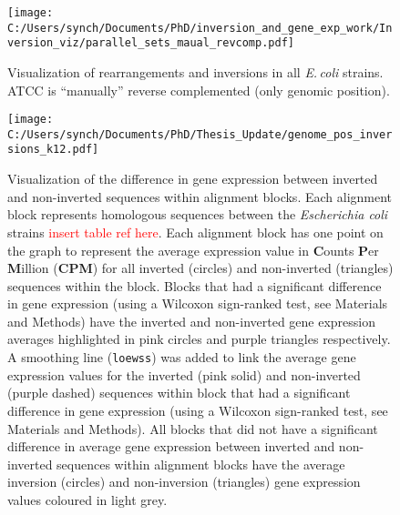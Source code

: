 \documentclass[12pt]{article}
\newcommand{\ecol}{\textit{E.\,coli}\xspace}
\newcommand{\ecoli}{\textit{Escherichia coli}\xspace}
\begin{document}
\begin{figure}
	\texttt{[image: C:/Users/synch/Documents/PhD/inversion\_and\_gene\_exp\_work/Inversion\_viz/parallel\_sets\_maual\_revcomp.pdf]}
	\caption{\label{fig:inversion_manual_revcomp} Visualization of rearrangements and inversions in all \ecol strains. ATCC is ``manually'' reverse complemented (only genomic position).}
\end{figure}

\begin{figure}
	\texttt{[image: C:/Users/synch/Documents/PhD/Thesis\_Update/genome\_pos\_inversions\_k12.pdf]}
	\caption{\label{fig:inver_exp} Visualization of the difference in gene expression between inverted and non-inverted sequences within alignment blocks. Each alignment block represents homologous sequences between the \ecoli strains \textcolor{red}{insert table ref here}. Each alignment block has one point on the graph to represent the average expression value in \textbf{C}ounts \textbf{P}er \textbf{M}illion (\textbf{CPM}) for all inverted (circles) and non-inverted (triangles) sequences within the block. Blocks that had a significant difference in gene expression (using a Wilcoxon sign-ranked test, see Materials and Methods) have the inverted and non-inverted gene expression averages highlighted in pink circles and purple triangles respectively. A smoothing line (\texttt{loewss}) was added to link the average gene expression values for the inverted (pink solid) and non-inverted (purple dashed) sequences within block that had a significant difference in gene expression (using a Wilcoxon sign-ranked test, see Materials and Methods). All blocks that did not have a significant difference in average gene expression between inverted and non-inverted sequences within alignment blocks have the average inversion (circles) and non-inversion (triangles) gene expression values coloured in light grey.}
\end{figure}
\end{document}

